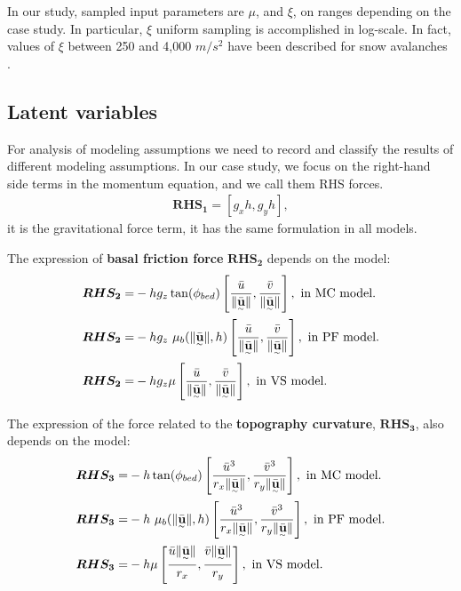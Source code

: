 \documentclass{article}
\begin{document}
In our study, sampled input parameters are $\mu$, and $\xi$, on ranges depending on the case study. In particular, $\xi$ uniform sampling is accomplished in log-scale. In fact, values of $\xi$ between 250 and 4,000 $m/s^2$ have been described for snow avalanches \citep{Salm1993,Bartelt1999,Gruber2007}.

\subsection{Latent variables}\label{sec:Fterms}
For analysis of modeling assumptions we need to record and classify the results of different modeling assumptions. In our case study, we focus on the right-hand side terms in the momentum equation, and we call them RHS forces. 
\begin{align}
\boldsymbol{RHS_1} = [g_x h,g_y h],
\end{align}
it is the gravitational force term, it has the same formulation in all models.

The expression of {\bf basal friction force} $\boldsymbol{RHS_2}$ depends on the model:
\begin{align}
\boldsymbol{RHS_2} =& -h g_z\tan(\phi_{bed})\left[\frac{\bar{u}}{\| \underset{^\sim}{\bar{\textbf u}} \|}, \frac{\bar{v}}{\| \underset{^\sim}{\bar{\textbf u}} \|} \right],\textmd{ in MC model.}\nonumber\\
\boldsymbol{RHS_2} =& - h g_z \ \mu_{b}(\|\underset{^\sim}{\bar{\textbf{u}}} \| , h)\left[\frac{\bar{u}}{\| \underset{^\sim}{\bar{\textbf{u}}} \|}, \frac{\bar{v}}{\| \underset{^\sim}{\bar{\textbf{u}}} \|}\right],\textmd{ in PF model.}\\
\boldsymbol{RHS_2} =& -h g_{z} \mu\left[\frac{\bar{u}}{\| \underset{^\sim}{\bar{\textbf u}}\|} , \frac{\bar{v}}{\| \underset{^\sim}{\bar{\textbf u}}\|}\right],\textmd{ in VS model.}\nonumber
\end{align}

The expression of the force related to the {\bf topography curvature}, $\boldsymbol{RHS_3}$, also depends on the model:
\begin{align}
\boldsymbol{RHS_3} =&-h \tan(\phi_{bed})\left[\frac{\bar{u}^3}{r_x\| \underset{^\sim}{\bar{\textbf{u}}} \|}, \frac{\bar{v}^3}{r_y\| \underset{^\sim}{\bar{\textbf{u}}} \|}\right],\textmd{ in MC model.}\nonumber\\
\boldsymbol{RHS_3} =& -h\ \mu_{b}(\|\underset{^\sim}{\bar{\textbf{u}}} \|,h)\left[\frac{\bar{u}^3}{r_x\| \underset{^\sim}{\bar{\textbf{u}}} \|}, \frac{\bar{v}^3}{r_y\| \underset{^\sim}{\bar{\textbf{u}}} \|}\right],\textmd{ in PF model.}\\
\boldsymbol{RHS_3} =& -h \mu\left[\frac{\bar{u}\| \underset{^\sim}{\bar{\textbf u}} \|}{r_{x}},\frac{\bar{v}\| \underset{^\sim}{\bar{\textbf u}} \|}{r_{y}}\right],\textmd{ in VS model.}\nonumber
\end{align}
\end{document}
